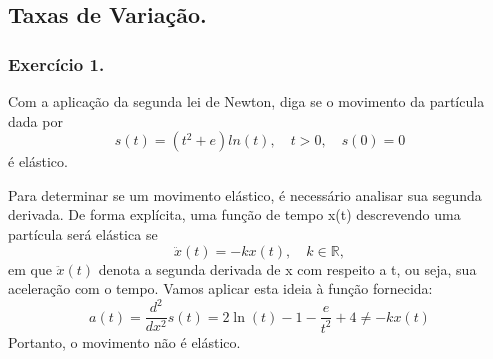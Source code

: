 \subsection{Taxas de Varia\c c\~ao.}
\subsubsection{Exerc\'icio 1.} Com a aplica\c c\~ao da segunda lei de Newton, diga se 
o movimento da part\'icula dada por 
$$
s(t) = (t^2 + e)ln(t), \quad t>0, \quad s(0) = 0
$$
\'e el\'astico.
\begin{proof*}
Para determinar se um movimento el\'astico, \'e necess\'ario analisar sua segunda derivada. De 
forma expl\'icita, uma fun\c c\~ao de tempo x(t) descrevendo uma part\'icula ser\'a el\'astica se 
$$
\ddot{x}(t) = -kx(t), \quad k\in\mathbb{R},
$$
em que $\ddot{x}(t)$ denota a segunda derivada de x com respeito a t, ou seja, sua acelera\c c\~ao com o tempo. Vamos aplicar esta ideia 
\`a fun\c c\~ao fornecida:
$$
a(t) = \frac{d^2}{dx^2} s(t) = 2\ln (t) -1 - \frac{e}{t^2} + 4 \neq -kx(t)
$$
Portanto, o movimento n\~ao \'e el\'astico.
\end{proof*}